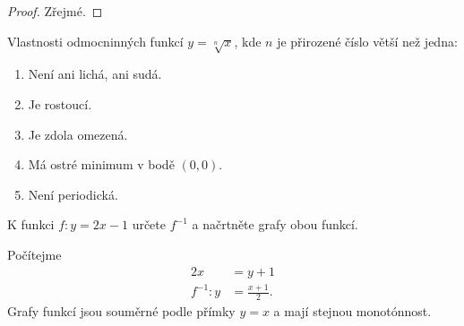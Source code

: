 \begin{proof}
    Zřejmé.
\end{proof}

\begin{veta}
    Vlastnosti odmocninných funkcí $y= \sqrt[n]{x}$, kde $n$ je přirozené číslo větší
    než jedna:
    \begin{enumerate}[$i.$]
        \item Není ani lichá, ani sudá.
       	\item Je rostoucí.
        \item Je zdola omezená.
        \item Má ostré minimum v bodě $(0,0).$
        \item Není periodická.
    \end{enumerate}
\end{veta}

\begin{priklad}
K funkci $f:y=2x-1$ určete $f^{-1}$ a načrtněte grafy obou funkcí.
\end{priklad}

\begin{reseni}
Počítejme
\begin{align*}
    2x&=y+1\\
    f^{-1}:y &= \frac{x+1}{2}.
\end{align*}
Grafy funkcí jsou souměrné podle přímky $y=x$ a mají stejnou monotónnost.
\end{reseni}
